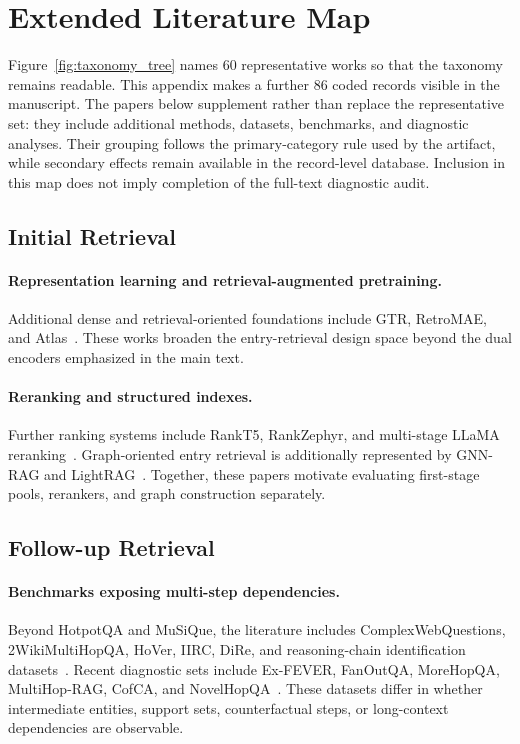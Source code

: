 \section{Extended Literature Map}
\label{app:extended_literature}

Figure~\ref{fig:taxonomy_tree} names 60 representative works so that the taxonomy remains readable. This appendix makes a further 86 coded records visible in the manuscript. The papers below supplement rather than replace the representative set: they include additional methods, datasets, benchmarks, and diagnostic analyses. Their grouping follows the primary-category rule used by the artifact, while secondary effects remain available in the record-level database. Inclusion in this map does not imply completion of the full-text diagnostic audit.

\subsection{Initial Retrieval}
\paragraph{Representation learning and retrieval-augmented pretraining.}
Additional dense and retrieval-oriented foundations include GTR, RetroMAE, and Atlas~\cite{extIR016,extIR018,extIR021}. These works broaden the entry-retrieval design space beyond the dual encoders emphasized in the main text.

\paragraph{Reranking and structured indexes.}
Further ranking systems include RankT5, RankZephyr, and multi-stage LLaMA reranking~\cite{extIR025,extIR026,extIR030}. Graph-oriented entry retrieval is additionally represented by GNN-RAG and LightRAG~\cite{extIR032,extIR034}. Together, these papers motivate evaluating first-stage pools, rerankers, and graph construction separately.

\subsection{Follow-up Retrieval}
\paragraph{Benchmarks exposing multi-step dependencies.}
Beyond HotpotQA and MuSiQue, the literature includes ComplexWebQuestions, 2WikiMultiHopQA, HoVer, IIRC, DiRe, and reasoning-chain identification datasets~\cite{extFR003,extFR009,extFR010,extFR011,extFR012,extFR013}. Recent diagnostic sets include Ex-FEVER, FanOutQA, MoreHopQA, MultiHop-RAG, CofCA, and NovelHopQA~\cite{extFR041,extFR043,extFR044,extFR045,extFR054,extFR061}. These datasets differ in whether intermediate entities, support sets, counterfactual steps, or long-context dependencies are observable.

